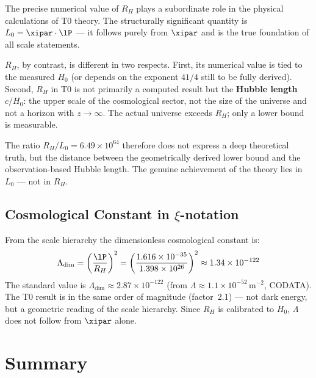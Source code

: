\begin{foundation}
The precise numerical value of $R_H$ plays a subordinate role in the physical calculations of T0 theory. The structurally significant quantity is $L_0 = \xipar \cdot \lP$ — it follows purely from $\xipar$ and is the true foundation of all scale statements.

$R_H$, by contrast, is different in two respects. First, its numerical value is tied to the measured $H_0$ (or depends on the exponent $41/4$ still to be fully derived). Second, $R_H$ in T0 is not primarily a computed result but the \textbf{Hubble length} $c/H_0$: the upper scale of the cosmological sector, not the size of the universe and not a horizon with $z \to \infty$. The actual universe exceeds $R_H$; only a lower bound is measurable.

The ratio $R_H/L_0 = 6{.}49 \times 10^{64}$ therefore does not express a deep theoretical truth, but the distance between the geometrically derived lower bound and the observation-based Hubble length. The genuine achievement of the theory lies in $L_0$ — not in $R_H$.
\end{foundation}

\subsection{Cosmological Constant in \texorpdfstring{$\xi$}{xi}-notation}

From the scale hierarchy the dimensionless cosmological constant is:
\begin{equation}
	\Lambda_{\text{dim}} = \left(\frac{\lP}{R_H}\right)^2 = \left(\frac{1{.}616 \times 10^{-35}}{1{.}398 \times 10^{26}}\right)^2 \approx 1{.}34 \times 10^{-122}
\end{equation}
The standard value is $\Lambda_{\text{dim}} \approx 2{.}87 \times 10^{-122}$ (from $\Lambda \approx 1{.}1 \times 10^{-52}\,\text{m}^{-2}$, CODATA). The T0 result is in the same order of magnitude (factor~2.1) — not dark energy, but a geometric reading of the scale hierarchy. Since $R_H$ is calibrated to $H_0$, $\Lambda$ does not follow from $\xipar$ alone.

\section{Summary}

